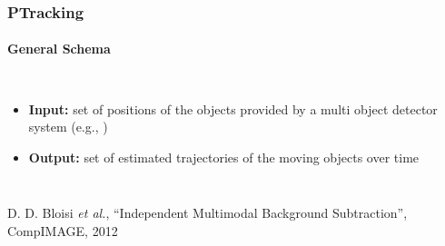 \begin{frame}
	\frametitle{PTracking}
	\framesubtitle{General Schema}
	
	\vspace{-0.27cm}
	
	\begin{columns}[T]
		
		\vspace{0.8cm}
		
		\begin{itemize}
			\item \textbf{Input:} set of positions of the objects provided by a multi object detector
				  system (e.g., \cite{Bloisi12})
			
			\vspace{1.6cm}
			
			\item \textbf{Output:} set of estimated trajectories of the moving objects over time
		\end{itemize}
		
		\centering
		
	\end{columns}
	
	\vspace{0.3cm}
	
	\tiny
	
	\cite{Bloisi12} D. D. Bloisi \emph{et al.},  ``Independent Multimodal Background Subtraction'',
	CompIMAGE, 2012
\end{frame}

